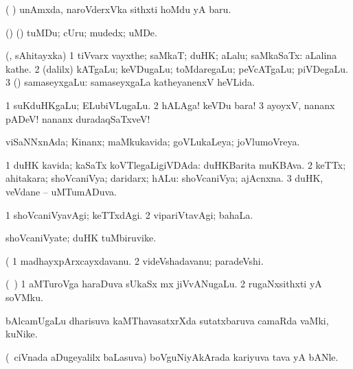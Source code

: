 {{{{{{\noindent
\gl{\pagu}
\expl{}
\bmng
{} ( \ashi) unAmxda, naroVderxVka sithxti hoMdu yA baru. 
\emng
\eentry

\bentry
{} 
\gl{\nA}
\expl{}
\bmng
(\birx) (\AmA) tuMDu; cUru; mudedx; uMDe. 
\emng
\eentry

\bentry
{} 
\gl{\nA}
\expl{}
\bmng
(\pArxparx, sAhitayxka) 
\bnum
\num{1} tiVvarx vayxthe; saMkaT; duHK; aLalu; saMkaSaTx:  aLalina kathe. 
\num{2} (\bava dalilx) kATgaLu; keVDugaLu; toMdaregaLu; peVcATgaLu; piVDegaLu. 
\num{3} (\hA) samaseyxgaLu:  samaseyxgaLa katheyanenxV heVLida. 
\enum
\emng

\noindent
\gl{\pagu}
\expl{}
\bmng
\bnum
\num{1}  suKduHKgaLu; ELubiVLugaLu. 
\num{2}  hALAga! keVDu bara! 
\num{3}  ayoyxV, nananx pADeV! nananx duradaqSaTxveV! 
\enum
\emng
\eentry

\bentry
{} 
\gl{\gu}
\expl{}
\bmng
viSaNNxnAda; Kinanx; maMkukavida; goVLukaLeya; joVlumoVreya. 
\emng
\eentry

\bentry
{} 
\gl{\gu}
\expl{}
\bmng
\bnum
\num{1} duHK kavida; kaSaTx koVTlegaLigiVDAda:  duHKBarita muKBAva. 
\num{2} keTTx; ahitakara; shoVcaniVya; daridarx; hALu:  shoVcaniVya; ajAcnxna. 
\num{3} duHK, veVdane -- uMTumADuva. 
\enum
\emng
\eentry

\bentry
{} 
\gl{\kirxvi}
\expl{}
\bmng
\bnum
\num{1} shoVcaniVyavAgi; keTTxdAgi. 
\num{2} vipariVtavAgi; bahaLa. 
\enum
\emng
\eentry

\bentry
{} 
\gl{\nA}
\expl{}
\bmng
shoVcaniVyate; duHK tuMbiruvike. 
\emng
\eentry

\bentry
{} 
\gl{\nA}
\expl{}
\gl{\ashi}
\bmng
( 
\bnum
\num{1} madhayxpArxcayxdavanu. 
\num{2} videVshadavanu; paradeVshi. 
\enum
\emng
\eentry

\bentry
{} 
\gl{\nA}
\expl{}
\bmng
(\AseTxrXV\ \ashi) 
\bnum
\num{1} aMTuroVga haraDuva sUkaSx mx jiVvANugaLu. 
\num{2} rugaNxsithxti yA soVMku. 
\enum
\emng
\eentry

\bentry
{} 
\gl{\nA}
\expl{}
\bmng
bAlcamUgaLu dharisuva kaMThavasatxrXda sutatxbaruva camaRda vaMki, kuNike. 
\emng
\eentry

\bentry
{} 
\gl{\nA}
\expl{}
\bmng
(\kanmu\ ciVnada aDugeyalilx baLasuva) boVguNiyAkArada kariyuva tava yA bANle. 
\emng
\eentry

}}}}}}

